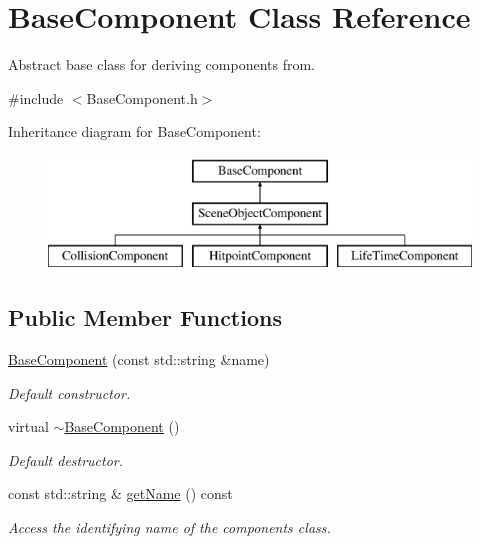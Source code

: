 \hypertarget{class_base_component}{}\section{Base\+Component Class Reference}
\label{class_base_component}


Abstract base class for deriving components from.  




{\ttfamily \#include $<$Base\+Component.\+h$>$}

Inheritance diagram for Base\+Component\+:\begin{figure}[H]
\begin{center}
\leavevmode
\includegraphics[height=3.000000cm]{class_base_component}
\end{center}
\end{figure}
\subsection*{Public Member Functions}
\begin{DoxyCompactItemize}
\item 
\hyperlink{class_base_component_ab5956c1e3164494e3bb46c65b5a3130a}{Base\+Component} (const std\+::string \&name)
\begin{DoxyCompactList}\small\item\em Default constructor. \end{DoxyCompactList}\item 
virtual \hyperlink{class_base_component_ab281730e838c4cb33e96ab6d6b7fe15f}{$\sim$\+Base\+Component} ()
\begin{DoxyCompactList}\small\item\em Default destructor. \end{DoxyCompactList}\item 
const std\+::string \& \hyperlink{class_base_component_a16c78063bc26ca947dc9944b370e9fdb}{get\+Name} () const 
\begin{DoxyCompactList}\small\item\em Access the identifying name of the component\textquotesingle{}s class. \end{DoxyCompactList}\end{DoxyCompactItemize}
